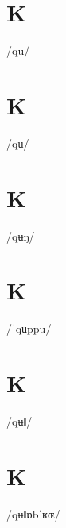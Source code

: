 \documentclass[10pt,a4paper,twoside]{book}
\begin{document}
\section*{K}

\begin{multicols}{3}
 {/qu/} {}
\end{multicols}

\section*{K}

\begin{multicols}{3}
 {/qʉ/} {}
\end{multicols}

\section*{K}

\begin{multicols}{3}
 {/qʉŋ/} {}
\end{multicols}

\section*{K}

\begin{multicols}{3}
 {/ˈqʉppu/} {}
\end{multicols}

\section*{K}

\begin{multicols}{3}
 {/qʉǁ/} {}
\end{multicols}

\section*{K}

\begin{multicols}{3}
 {/qʉǁɒbˈʁɶ/} {}
\end{multicols}
\end{document}
